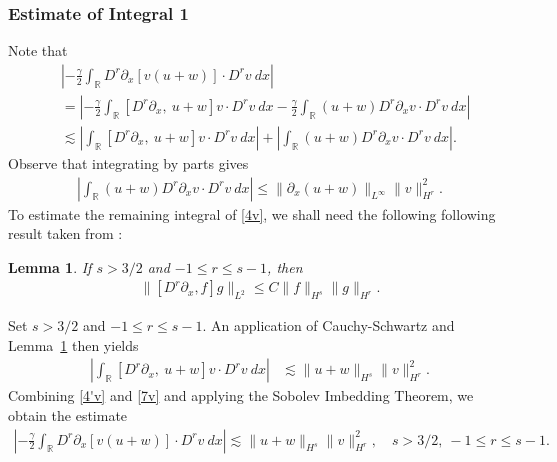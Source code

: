 \documentclass[12pt,reqno]{amsart}
\numberwithin{equation}{section}  %
\numberwithin{figure}{section}
\newcommand{\rr}{\mathbb{R}}
\newcommand{\p}{\partial}
\newtheorem{lemma}[theorem]{Lemma}
\begin{document}
\subsubsection{Estimate of Integral 1} Note that
%
%
\begin{equation}
\begin{split}
& \left |  -\frac{\gamma}{2} \int_{\rr} D^r \p_x [v(u+w)] \cdot
D^r v \ dx \right |
\\
& =
\left |
-\frac{\gamma}{2} \int_{\rr} \left[ D^r \p_x, \ u+w \right]v \cdot
D^r v \ dx - \frac{\gamma}{2} \int_{\rr} (u+w) D^r
\p_x v \cdot D^r v\ dx
\right | \\
& \lesssim \left |
\int_{\rr} \left[ D^r \p_x, \ u+w \right]v \cdot
D^r v \ dx \right |
+ \left | \int_{\rr} (u+w) D^r \p_x v
\cdot D^r v\
dx \right |.
\label{4v}
\end{split}
\end{equation}
%
%
Observe that integrating by parts gives
%
%
\begin{equation}
\begin{split}
\left | \int_{\rr} (u+w) D^r \p_x v \cdot
D^r v \ dx \right |
\le \|\p_x (u+w)\|_{L^\infty}
\|v\|_{H^r}^2.
\label{4'v}
\end{split}
\end{equation}
%
%
%
%
To estimate the remaining integral of \eqref{4v}, we shall need the following
following result taken from \cite{Himonas_2009_Non-uniform-dep-per}:
%
\begin{lemma}
\label{cor1}
If $s > 3/2$ and $-1 \le r  \le s -1$, then
%
%
\begin{equation}
\begin{split}
\|[D^r \p_x ,f]g\|_{L^2} \le C \|f\|_{H^s} \|g\|_{H^r}.
\label{15}
\end{split}
\end{equation}
%
%
\end{lemma}
%
%
Set $s > 3/2$ and $-1 \le r \le s -1$. An application of 
Cauchy-Schwartz and Lemma~\ref{cor1} then yields 
%
%
\begin{equation}
\begin{split}
 \left | \int_{\rr} [D^r \p_x, \ u+w] v
\cdot D^r v \ dx \right |
& \lesssim \|u+w\|_{H^s} 
\|v\|_{H^r}^2.
\label{7v}
\end{split}
\end{equation}
%
%
Combining \eqref{4'v} and \eqref{7v} and applying the Sobolev Imbedding 
Theorem, we obtain the estimate
%
%
\begin{equation}
\begin{split}
\left |  -\frac{\gamma}{2} \int_{\rr} D^r \p_x [v(u+w)] \cdot
D^r v \ dx \right |
 \lesssim \|u+w\|_{H^s} \|v\|_{H^r}^2, \quad s > 3/2, \ -1 \le r \le s-1.
\label{8v}
\end{split}
\end{equation}
%
%
\end{document}
